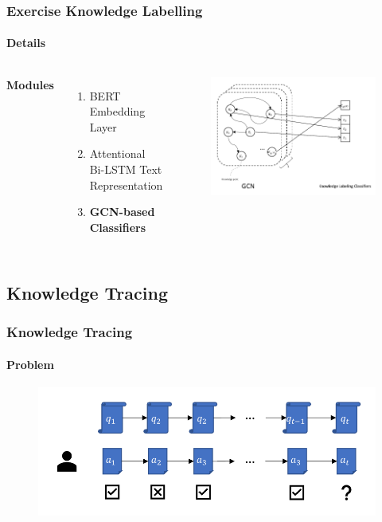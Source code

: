 \documentclass{beamer}
\begin{document}
\begin{frame}
  \frametitle{Exercise Knowledge Labelling}
  \framesubtitle{Details}
  \begin{columns}[c] %
    \textbf{Modules}
    \begin{enumerate}
      \item BERT~\cite{devlin2019bert} Embedding Layer
      \item Attentional Bi-LSTM Text Representation
      \item \textbf{GCN-based Classifiers}
    \end{enumerate}
    \begin{figure}
      \includegraphics[width=1.0\textwidth]{figures/ch2-gcn-ov.pdf}
    \end{figure}
  \end{columns}
\end{frame}

\subsection{Knowledge Tracing}

\begin{frame}
  \frametitle{Knowledge Tracing}
  \framesubtitle{Problem}
  \begin{figure}
    \includegraphics[width=1.0\textwidth]{figures/ch3-model-ktdes.pdf}
  \end{figure}
\end{frame}
\end{document}
